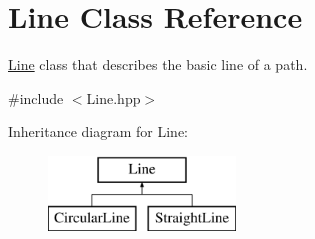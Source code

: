 \hypertarget{class_line}{}\section{Line Class Reference}
\label{class_line}


\mbox{\hyperlink{class_line}{Line}} class that describes the basic line of a path.  




{\ttfamily \#include $<$Line.\+hpp$>$}

Inheritance diagram for Line\+:\begin{figure}[H]
\begin{center}
\leavevmode
\includegraphics[height=2.000000cm]{class_line}
\end{center}
\end{figure}
